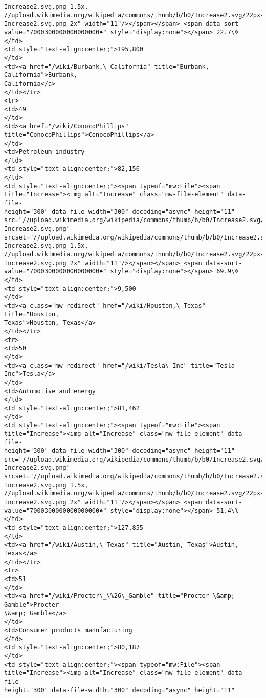 \documentclass[11pt]{article}
\begin{document}
\begin{Verbatim}[commandchars=\\\{\}]
Increase2.svg.png 1.5x,
//upload.wikimedia.org/wikipedia/commons/thumb/b/b0/Increase2.svg/22px-
Increase2.svg.png 2x" width="11"/></span></span> <span data-sort-
value="7000300000000000000♠" style="display:none"></span> 22.7\%
</td>
<td style="text-align:center;">195,800
</td>
<td><a href="/wiki/Burbank,\_California" title="Burbank, California">Burbank,
California</a>
</td></tr>
<tr>
<td>49
</td>
<td><a href="/wiki/ConocoPhillips" title="ConocoPhillips">ConocoPhillips</a>
</td>
<td>Petroleum industry
</td>
<td style="text-align:center;">82,156
</td>
<td style="text-align:center;"><span typeof="mw:File"><span
title="Increase"><img alt="Increase" class="mw-file-element" data-file-
height="300" data-file-width="300" decoding="async" height="11"
src="//upload.wikimedia.org/wikipedia/commons/thumb/b/b0/Increase2.svg/11px-
Increase2.svg.png"
srcset="//upload.wikimedia.org/wikipedia/commons/thumb/b/b0/Increase2.svg/17px-
Increase2.svg.png 1.5x,
//upload.wikimedia.org/wikipedia/commons/thumb/b/b0/Increase2.svg/22px-
Increase2.svg.png 2x" width="11"/></span></span> <span data-sort-
value="7000300000000000000♠" style="display:none"></span> 69.9\%
</td>
<td style="text-align:center;">9,500
</td>
<td><a class="mw-redirect" href="/wiki/Houston,\_Texas" title="Houston,
Texas">Houston, Texas</a>
</td></tr>
<tr>
<td>50
</td>
<td><a class="mw-redirect" href="/wiki/Tesla\_Inc" title="Tesla Inc">Tesla</a>
</td>
<td>Automotive and energy
</td>
<td style="text-align:center;">81,462
</td>
<td style="text-align:center;"><span typeof="mw:File"><span
title="Increase"><img alt="Increase" class="mw-file-element" data-file-
height="300" data-file-width="300" decoding="async" height="11"
src="//upload.wikimedia.org/wikipedia/commons/thumb/b/b0/Increase2.svg/11px-
Increase2.svg.png"
srcset="//upload.wikimedia.org/wikipedia/commons/thumb/b/b0/Increase2.svg/17px-
Increase2.svg.png 1.5x,
//upload.wikimedia.org/wikipedia/commons/thumb/b/b0/Increase2.svg/22px-
Increase2.svg.png 2x" width="11"/></span></span> <span data-sort-
value="7000300000000000000♠" style="display:none"></span> 51.4\%
</td>
<td style="text-align:center;">127,855
</td>
<td><a href="/wiki/Austin,\_Texas" title="Austin, Texas">Austin, Texas</a>
</td></tr>
<tr>
<td>51
</td>
<td><a href="/wiki/Procter\_\%26\_Gamble" title="Procter \&amp; Gamble">Procter
\&amp; Gamble</a>
</td>
<td>Consumer products manufacturing
</td>
<td style="text-align:center;">80,187
</td>
<td style="text-align:center;"><span typeof="mw:File"><span
title="Increase"><img alt="Increase" class="mw-file-element" data-file-
height="300" data-file-width="300" decoding="async" height="11"

\end{Verbatim}
\end{document}
